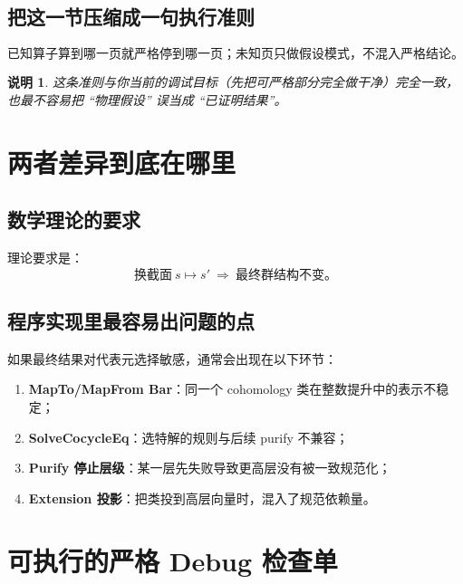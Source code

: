 \documentclass[a4paper,fontset=ubuntu,12pt]{ctexart}
\newtheorem{remark}[definition]{说明}
\begin{document}
\subsection{把这一节压缩成一句执行准则}

\begin{equation}
\text{已知算子算到哪一页就严格停到哪一页；未知页只做假设模式，不混入严格结论。}
\label{eq:ppip-rule}
\end{equation}

\begin{remark}
这条准则与你当前的调试目标（先把可严格部分完全做干净）完全一致，也最不容易把 ``物理假设'' 误当成 ``已证明结果''。
\end{remark}

\section{两者差异到底在哪里}
\label{sec:difference}

\subsection{数学理论的要求}

理论要求是：
\begin{equation}
\text{换截面}\ s\mapsto s' \ \Longrightarrow\ \text{最终群结构不变。}
\label{eq:invariance-principle}
\end{equation}

\subsection{程序实现里最容易出问题的点}

如果最终结果对代表元选择敏感，通常会出现在以下环节：
\begin{enumerate}
\item \textbf{MapTo/MapFrom Bar}：同一个 cohomology 类在整数提升中的表示不稳定；
\item \textbf{SolveCocycleEq}：选特解的规则与后续 purify 不兼容；
\item \textbf{Purify 停止层级}：某一层先失败导致更高层没有被一致规范化；
\item \textbf{Extension 投影}：把类投到高层向量时，混入了规范依赖量。
\end{enumerate}

\section{可执行的严格 Debug 检查单}
\label{sec:checklist}
\end{document}
